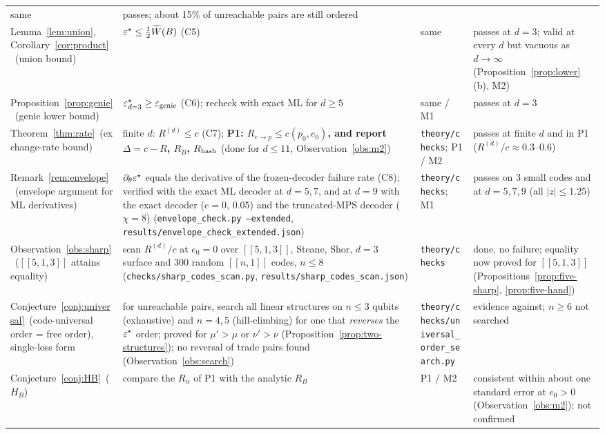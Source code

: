 {\begin{longtable}{p{3.7cm} p{4.5cm} p{3.2cm} p{2.6cm}}
same & passes; about 15\% of unreachable pairs are still ordered \\
Lemma~\ref{lem:union}, Corollary~\ref{cor:product}\ (union bound) &
$\varepsilon^{\star}\le\tfrac12\widetilde W(B)$ (C5) & same & passes at $d=3$; valid at every $d$ but vacuous as $d\to\infty$ (Proposition~\ref{prop:lower}(b), M2) \\
Proposition~\ref{prop:genie}\ (genie lower bound) &
$\varepsilon^{\star}_{d=3}\ge\varepsilon_{\rm genie}$ (C6); recheck with exact ML for $d\ge5$ &
same / M1 & passes at $d=3$ \\
Theorem~\ref{thm:rate}\ (exchange-rate bound) &
finite $d$: $R^{(d)}\le c$ (C7); \textbf{P1: $R_{e\to p}\le c(p_0,e_0)$, and report $\Delta=c-R$, $R_B$, $R_{\rm hash}$} (done for $d\le11$, Observation~\ref{obs:m2}) &
\texttt{theory/checks}; P1 / M2 & passes at finite $d$ and in P1 ($R^{(d)}/c\approx0.3$--$0.6$) \\
Remark~\ref{rem:envelope}\ (envelope argument for ML derivatives) &
$\partial_\theta\varepsilon^{\star}$ equals the derivative of the frozen-decoder failure rate (C8); verified with the exact ML decoder at $d=5,7$, and at $d=9$ with the exact decoder ($e=0$, $0.05$) and the truncated-MPS decoder ($\chi=8$) (\texttt{envelope\_check.py --extended}, \texttt{results/envelope\_check\_extended.json}) &
\texttt{theory/checks}; M1 & passes on 3 small codes and at $d=5,7,9$ (all $|z|\le1.25$) \\
Observation~\ref{obs:sharp}\ ($[[5,1,3]]$ attains equality) &
scan $R^{(d)}/c$ at $e_0{=}0$ over $[[5,1,3]]$, Steane, Shor, $d=3$ surface and 300 random $[[n,1]]$ codes, $n\le8$ (\texttt{checks/sharp\_codes\_scan.py}, \texttt{results/sharp\_codes\_scan.json}) &
\texttt{theory/checks} & done, no failure; equality now proved for $[[5,1,3]]$ (Propositions~\ref{prop:five-sharp}, \ref{prop:five-hand}) \\
Conjecture~\ref{conj:universal}\ (code-universal order = free order), single-loss form &
for unreachable pairs, search all linear structures on $n\le3$ qubits (exhaustive) and $n=4,5$ (hill-climbing) for one that \emph{reverses} the $\varepsilon^{\star}$ order; proved for $\mu'>\mu$ or $\nu'>\nu$ (Proposition~\ref{prop:two-structures}); no reversal of trade pairs found (Observation~\ref{obs:search}) &
\texttt{theory/checks/universal\_order\_search.py} & evidence against; $n\ge6$ not searched \\
Conjecture~\ref{conj:HB}\ ($H_B$) &
compare the $R_\alpha$ of P1 with the analytic $R_B$ &
P1 / M2 & consistent within about one standard error at $e_0>0$ (Observation~\ref{obs:m2}); not confirmed \\

\end{longtable}}
